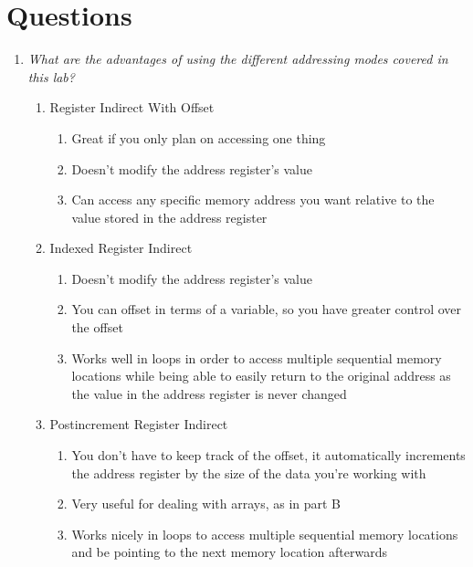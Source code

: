 \documentclass[letterpaper]{article}
\begin{document}
\section{Questions}
  \begin{enumerate}
    \item \textit{What are the advantages of using the different addressing modes covered in this lab?}
          \begin{enumerate}
            \item Register Indirect With Offset
              \begin{enumerate}
                \item Great if you only plan on accessing one thing
                \item Doesn't modify the address register's value
                \item Can access any specific memory address you want relative to the value 
                      stored in the address register
              \end{enumerate}
            \item Indexed Register Indirect
            \begin{enumerate}
              \item Doesn't modify the address register's value
              \item You can offset in terms of a variable, so you have greater control over the offset
              \item Works well in loops in order to access multiple sequential memory locations 
                    while being able to easily return to the original address as the value in the 
                    address register is never changed
            \end{enumerate}
            \item Postincrement Register Indirect
            \begin{enumerate}
              \item You don't have to keep track of the offset, it automatically
                    increments the address register by the size of the data
                    you're working with
              \item Very useful for dealing with arrays, as in part B
              \item Works nicely in loops to access multiple sequential memory 
                    locations and be pointing to the next memory location afterwards
            \end{enumerate}
          \end{enumerate}


\end{enumerate}
\end{document}
